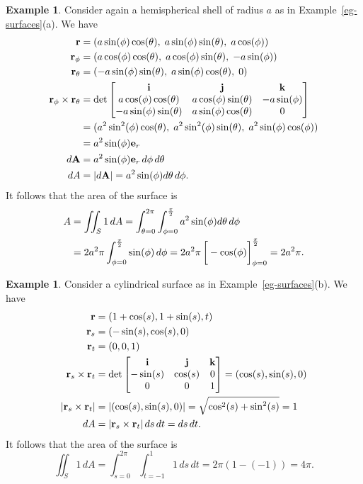 \documentclass[reqno]{amsart}
\theoremstyle{definition}
\newtheorem{example}[theorem]{Example}
\begin{document}
\begin{example}\label{eg-hemisphere-area}
 Consider again a hemispherical shell of radius $a$ as in
 Example~\ref{eg-surfaces}(a).  We have
 \begin{align*}
  \mathbf{r} &= (a\sin(\phi)\cos(\theta),\;a\sin(\phi)\sin(\theta),\;a\cos(\phi)) \\
  \mathbf{r}_\phi &= (a\cos(\phi)\cos(\theta),\;a\cos(\phi)\sin(\theta),\;-a\sin(\phi))\\
  \mathbf{r}_\theta &= (-a\sin(\phi)\sin(\theta),\;a\sin(\phi)\cos(\theta),\;0) \\
  \mathbf{r}_\phi\times\mathbf{r}_\theta &= 
   \det\left[\begin{matrix} \mathbf{i} & \mathbf{j} & \mathbf{k} \\
    a\cos(\phi)\cos(\theta) & a\cos(\phi)\sin(\theta) & -a\sin(\phi) \\
    -a\sin(\phi)\sin(\theta) & a\sin(\phi)\cos(\theta) & 0 
   \end{matrix}\right] \\
   &= (a^2\sin^2(\phi)\cos(\theta),\;
       a^2\sin^2(\phi)\sin(\theta),\;
       a^2\sin(\phi)\cos(\phi)) \\
     &= a^2\sin(\phi)\mathbf{e}_r \\
  d\mathbf{A} &= a^2\sin(\phi)\mathbf{e}_r\,d\phi\,d\theta \\
  dA &= |d\mathbf{A}| = a^2\sin(\phi) d\theta\,d\phi.
 \end{align*}
 It follows that the area of the surface is 
 \begin{align*}
   A
    &= \iint_S 1\,dA
     = \int_{\azi=0}^{2\pi}\int_{\zen=0}^{\frac{\pi}{2}}a^2\sin(\zen)d\azi\,d\zen \\
    &= 2a^2\pi \int_{\zen=0}^{\frac{\pi}{2}}\sin(\zen)\,d\zen
     = 2a^2\pi\CH{-\cos(\zen)}_{\zen=0}^{\frac{\pi}{2}} = 2a^2\pi.
 \end{align*}
\end{example}
\begin{example}
 Consider a cylindrical surface as in Example~\ref{eg-surfaces}(b).
 We have
 \begin{align*}
  \mathbf{r} &= (1+\cos(s),1+\sin(s),t) \\
  \mathbf{r}_s &= (-\sin(s),\cos(s),0) \\
  \mathbf{r}_t &= (0,0,1) \\
  \mathbf{r}_s\times\mathbf{r}_t &= 
   \det\left[\begin{matrix} \mathbf{i} & \mathbf{j} & \mathbf{k} \\
     -\sin(s) & \cos(s) & 0 \\
     0 & 0 & 1 
   \end{matrix}\right] = (\cos(s),\sin(s),0) \\
  |\mathbf{r}_s\times\mathbf{r}_t| &= |(\cos(s),\sin(s),0)| = 
   \sqrt{\cos^2(s)+\sin^2(s)} = 1 \\
  dA &= |\mathbf{r}_s\times\mathbf{r}_t|\,ds\,dt = ds\,dt.
 \end{align*}
 It follows that the area of the surface is 
 \[ \iint_S 1\,dA =
     \int_{s=0}^{2\pi}\int_{t=-1}^1 1\,ds\,dt = 2\pi (1-(-1)) = 4\pi.
 \]
\end{example}
\end{document}
